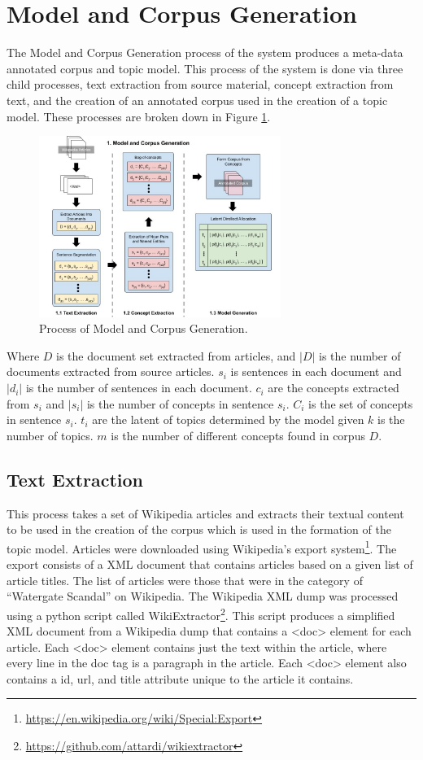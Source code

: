 \section{Model and Corpus Generation}
The Model and Corpus Generation process of the system produces a meta-data annotated corpus and topic model. This process of the system is done via three child processes, text extraction from source material, concept extraction from text, and the creation of an annotated corpus used in the creation of a topic model. These processes are broken down in Figure \ref{modelDesign}.

\begin{figure}[h]
    \centering
         \includegraphics[width=0.70\textwidth]{Figures/System_Design_Model_Gen.jpg}
          \caption{Process of Model and Corpus Generation.}
           \label{modelDesign}
\end{figure}
Where $D$ is the document set extracted from articles, and $|D|$ is the number of documents extracted from source articles. $s_i$ is sentences in each document and $|d_i|$ is the number of sentences in each document. $c_i$ are the concepts extracted from $s_i$ and $|s_i|$ is the number of concepts in sentence $s_i$. $C_i$ is the set of concepts in sentence $s_i$. $t_i$ are the latent of topics determined by the model given $k$ is the number of topics. $m$ is the number of different concepts found in corpus $D$.

\subsection{Text Extraction}
This process takes a set of Wikipedia articles and extracts their textual content to be used in the creation of the corpus which is used in the formation of the topic model. Articles were downloaded using Wikipedia’s export system\footnote{\url{https://en.wikipedia.org/wiki/Special:Export}}. The export consists of a XML document that contains articles based on a given list of article titles. The list of articles were those that were in the category of “Watergate Scandal” on Wikipedia. The Wikipedia XML dump was processed using a python script called WikiExtractor\footnote{\url{https://github.com/attardi/wikiextractor}}. This script produces a simplified XML document from a Wikipedia dump that contains a <doc> element for each article. Each <doc> element contains just the text within the article, where every line in the doc tag is a paragraph in the article. Each <doc> element also contains a id, url, and title attribute unique to the article it contains. 

